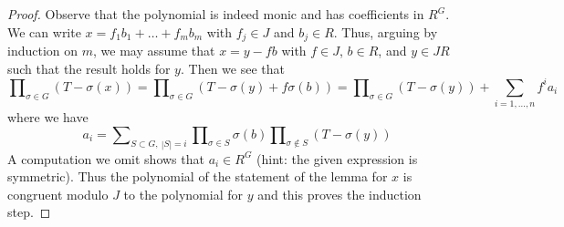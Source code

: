 \documentclass[10pt,a4paper]{amsart}
\theoremstyle{plain}
\theoremstyle{definition}
\theoremstyle{remark}
\numberwithin{equation}{subsection}
\begin{document}
\begin{proof}
Observe that the polynomial is indeed monic and has coefficients in $R^G$.
We can write $x = f_1 b_1 + \ldots + f_m b_m$ with $f_j \in J$ and $b_j \in R$.
Thus, arguing by induction on $m$, we may assume that $x = y - fb$ with
$f \in J$, $b \in R$, and $y \in JR$ such that the result holds for $y$.
Then we see that
$$
\prod\nolimits_{\sigma \in G} (T - \sigma(x)) =
\prod\nolimits_{\sigma \in G} (T - \sigma(y) + f\sigma(b)) =
\prod\nolimits_{\sigma \in G} (T - \sigma(y)) +
\sum_{i = 1, \ldots, n} f^i a_i
$$
where we have
$$
a_i =
\sum\nolimits_{S \subset G,\ |S| = i}
\prod\nolimits_{\sigma \in S} \sigma(b)
\prod\nolimits_{\sigma \not \in S} (T - \sigma(y))
$$
A computation we omit shows that $a_i \in R^G$ (hint: the given expression
is symmetric). Thus the polynomial
of the statement of the lemma
for $x$ is congruent modulo $J$ to the polynomial for $y$
and this proves the induction step.
\end{proof}
\end{document}
